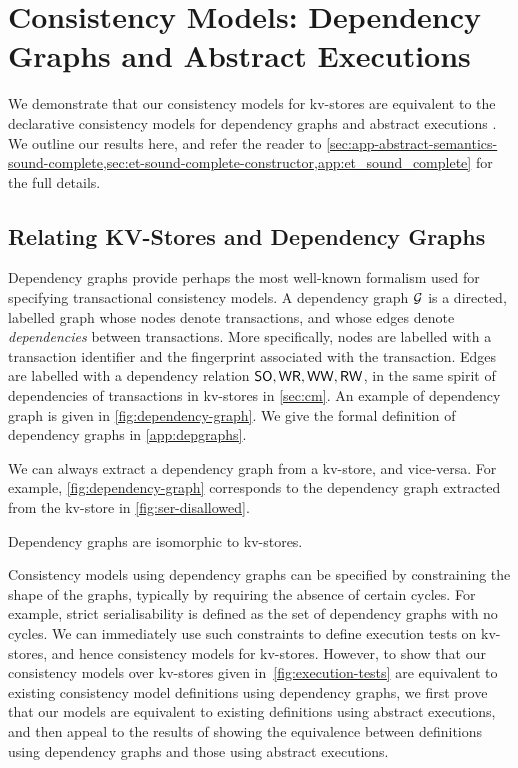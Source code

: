 \section{Consistency Models: Dependency Graphs and Abstract Executions}
\label{sec:other_formalisms}


We demonstrate that our consistency models for kv-stores
are equivalent to the declarative consistency models for 
dependency graphs \cite{adya} 
and abstract executions \cite{ev_transactions,framework-concur}. 
We outline our results here, and refer the reader
to \cref{sec:app-abstract-semantics-sound-complete,sec:et-sound-complete-constructor,app:et_sound_complete} for the full details.


\subsection{Relating KV-Stores and Dependency Graphs}
\label{sec:dep_graphs}
Dependency graphs \cite{adya-icde,adya} provide  perhaps the most
well-known 
formalism used for specifying transactional consistency models. 
A dependency graph \(\mathcal{G}\) is a directed, labelled graph whose 
nodes denote transactions, and whose edges denote \emph{dependencies} between transactions.  
More specifically, nodes are labelled with a transaction identifier
and the fingerprint associated with the  transaction. 
Edges are labelled with a dependency relation \(\mathsf{SO}, \mathsf{WR}, \mathsf{WW}, \mathsf{RW}\), in the 
same spirit of dependencies of transactions in kv-stores in \cref{sec:cm}.
An example of dependency graph is given in \cref{fig:dependency-graph}.
We give the formal definition of dependency graphs in \cref{app:depgraphs}.

We can always {extract} a dependency graph  from a kv-store, and vice-versa. 
For example, \cref{fig:dependency-graph} corresponds to the dependency graph extracted from the kv-store in \cref{fig:ser-disallowed}. 
\begin{theorem}
\label{thm:kv_graph_isomorph}
Dependency graphs are isomorphic to kv-stores.
\end{theorem}



Consistency models using dependency graphs can be specified by
constraining the shape of the graphs, typically by requiring the absence of certain cycles.  For example, strict serialisability is defined as
the set of dependency graphs with no cycles. %
We can immediately use such constraints to define execution tests on
kv-stores, and hence consistency models for kv-stores. However, to show 
that our consistency models over kv-stores given in~\cref{fig:execution-tests} are equivalent
to existing consistency model definitions using dependency graphs,
we first prove that our models are equivalent
to existing definitions using abstract executions, and then appeal 
to the results of \citet{laws} showing the equivalence between definitions using dependency graphs and those using abstract executions.  


